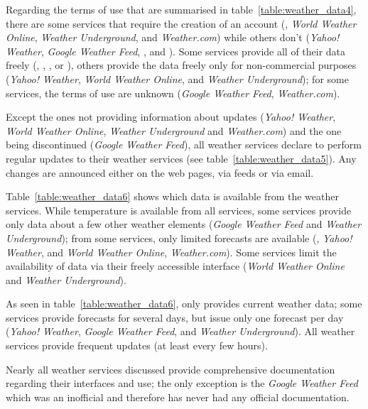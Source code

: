 Regarding the terms of use that are summarised in table~\ref{table:weather_data4}, there are some services that require the creation of an account (, \emph{World Weather Online}, \emph{Weather Underground}, and \emph{Weather.com}) while others don't (\emph{Yahoo! Weather}, \emph{Google Weather Feed}, \yrno, and ). Some services provide all of their data freely (, \yrno, , or ), others provide the data freely only for non-commercial purposes (\emph{Yahoo! Weather}, \emph{World Weather Online}, and \emph{Weather Underground}); for some services, the terms of use are unknown (\emph{Google Weather Feed}, \emph{Weather.com}).

Except the ones not providing information about updates (\emph{Yahoo! Weather}, \emph{World Weather Online}, \emph{Weather Underground} and \emph{Weather.com}) and the one being discontinued (\emph{Google Weather Feed}), all weather services declare to perform regular updates to their weather services (see table~\ref{table:weather_data5}). Any changes are announced either on the web pages, via  feeds or via email.

Table~\ref{table:weather_data6} shows which data is available from the weather services. While temperature is available from all services, some services provide only data about a few other weather elements (\emph{Google Weather Feed} and \emph{Weather Underground}); from some services, only limited forecasts are available (, \emph{Yahoo! Weather}, and \emph{World Weather Online}, \emph{Weather.com}). Some services limit the availability of data via their freely accessible interface (\emph{World Weather Online} and \emph{Weather Underground}).

As seen in table~\ref{table:weather_data6},  only provides current weather data; some services provide forecasts for several days, but issue only one forecast per day (\emph{Yahoo! Weather}, \emph{Google Weather Feed}, and \emph{Weather Underground}). All weather services provide frequent updates (at least every few hours).

Nearly all weather services discussed provide comprehensive documentation regarding their interfaces and use; the only exception is the \emph{Google Weather Feed} which was an inofficial  and therefore has never had any official documentation.


